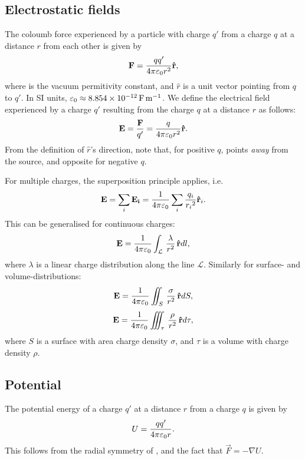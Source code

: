 \subsection{Electrostatic fields}
    The coloumb force experienced by a particle with charge $q'$ from a charge $q$ at a distance $r$ from each other is given by 
    \begin{equation}
        \vec{F} = \frac{qq'}{4\pi\e r^2}\hat{r},
    \end{equation}
    where \e is the vacuum permitivity constant, and $\hat{r}$ is a unit vector pointing from $q$ to $q'$. 
    In SI units, $\varepsilon_0 \approx \SI{8.854e-12}{\farad \per \metre}$.
    We define the electrical field experienced by a charge $q'$ resulting from the charge $q$ at a distance $r$ as follows:
    \begin{equation}
        \E = \frac{\vec{F}}{q'} = \frac{q}{4\pi\e r^2}\hat{r}.
    \end{equation}
    From the definition of $\hat{r}$'s direction, note that, for positive $q$, 
    \E{} points \textit{away} from the source, and opposite for negative $q$.
    
    For multiple charges, the superposition principle applies, i.e. 
    \begin{equation}
        \E = \sum_i\vec{E_i} = \frac{1}{4\pi\e}\sum_i\frac{q_i}{{r_i}^2}\hat{r}_i.
    \end{equation}
    This can be generalised for continuous charges: 
    \begin{equation}
        \E = \frac{1}{4\pi\e}\int_\mathcal{L}\,\frac{\lambda}{r^2}\,\hat{r}dl,
    \end{equation}
    where $\lambda$ is a linear charge distribution along the line $\mathcal{L}$. Similarly for surface- and volume-distributions: 
    \begin{equation}
        \label{surface density integral}
        \E = \frac{1}{4\pi\e}\iint_S\,\frac{\sigma}{r^2}\,\hat{r}dS,
    \end{equation}
    \begin{equation}
        \E = \frac{1}{4\pi\e}\iiint_{\tau}\,\frac{\rho}{r^2}\,\hat{r}d\tau,
    \end{equation}
    where $S$ is a surface with area charge density $\sigma$, and $\tau$ is a volume with charge density $\rho$.
    
\subsection{Potential}
    The potential energy of a charge $q'$ at a distance $r$ from a charge $q$ is given by
    \begin{equation}
        U = \frac{qq'}{4\pi\varepsilon_0 r}.
    \end{equation}
    This follows from the radial symmetry of \E, and the fact that $\vec{F} = - \nabla U$.
    
